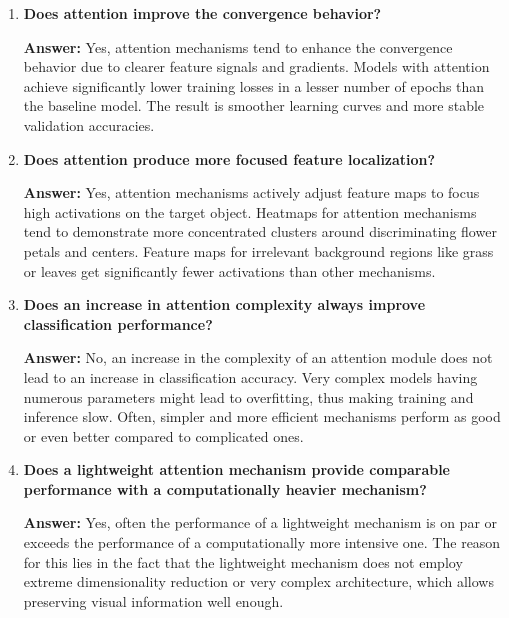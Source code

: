 \documentclass[10pt]{article}
\begin{document}
\begin{enumerate}
\vspace{5mm}

\item \textbf{Does attention improve the convergence behavior?}

\textbf{Answer:} Yes, attention mechanisms tend to enhance the convergence behavior due to clearer feature
signals and gradients. Models with attention achieve significantly lower training losses in a lesser number of epochs than the baseline model. The result is smoother learning curves and more stable validation accuracies.

\vspace{5mm}

\item \textbf{Does attention produce more focused feature localization?}

\textbf{Answer:} Yes, attention mechanisms actively adjust feature maps to focus high activations on the target object. Heatmaps for attention mechanisms tend to demonstrate more concentrated clusters around discriminating flower petals and centers. Feature maps for irrelevant background regions like grass or leaves get significantly fewer activations than other mechanisms.

\vspace{5mm}

\item \textbf{Does an increase in attention complexity always improve classification performance?}

\textbf{Answer:} No, an increase in the complexity of an attention module does not lead to an increase in classification accuracy. Very complex models having numerous parameters might lead to overfitting, thus making training and inference slow. Often, simpler and more efficient mechanisms perform as good or even better compared to complicated ones.

\vspace{5mm}

\item \textbf{Does a lightweight attention mechanism provide comparable performance with a computationally heavier mechanism?}

\textbf{Answer:}  Yes, often the performance of a lightweight mechanism is on par or exceeds the performance of a computationally more intensive one. The reason for this lies in the fact that the lightweight mechanism does not employ extreme dimensionality reduction or very complex architecture, which allows preserving visual information well enough.
 
\vspace{5mm}

\end{enumerate}
\end{document}
